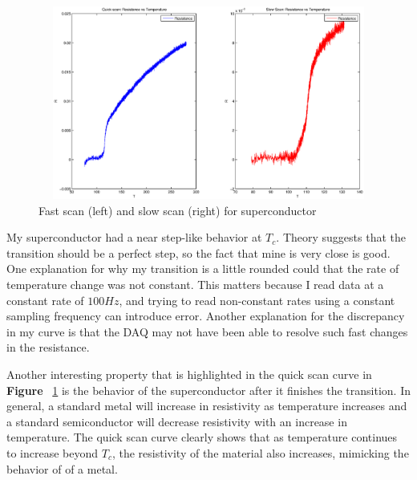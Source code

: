 \documentclass[paper=a4, fontsize=11pt]{scrartcl}
\numberwithin{equation}{section}
\numberwithin{figure}{section}
\numberwithin{table}{section}
\begin{document}
      \begin{figure}[ht]
              \centering
              \includegraphics[height=2.5in, width=6.5in]{Figures/curves.eps}
              \caption{Fast scan (left) and slow scan (right) for superconductor}
              \label{fig:curves}
      \end{figure}

      My superconductor had a near step-like behavior at $T_c$. Theory suggests that the transition should be a perfect step, so the fact that mine is very close is good. One explanation for why my transition is a little rounded could that the rate of temperature change was not constant. This matters because I read data at a constant rate of $100Hz$, and trying to read non-constant rates using a constant sampling frequency can introduce error. Another explanation for the discrepancy in my curve is that the DAQ may not have been able to resolve such fast changes in the resistance.

      Another interesting property that is highlighted in the quick scan curve in \textbf{Figure} ~\ref{fig:curves} is the behavior of the superconductor after it finishes the transition. In general, a standard metal will increase in resistivity as temperature increases and a standard semiconductor will decrease resistivity with an increase in temperature. The quick scan curve clearly shows that as temperature continues to increase beyond $T_c$, the resistivity of the material also increases, mimicking the behavior of of a metal.


  \clearpage
  \pagestyle{empty}
  

\end{document}
